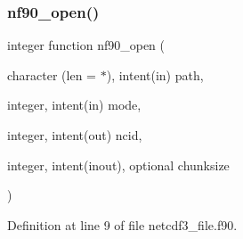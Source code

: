 \mbox{\label{netcdf3__file_8f90_ab845345239658f63b7e99d7700c1ad98}} 
\subsubsection{\texorpdfstring{nf90\+\_\+open()}{nf90\_open()}}
{\footnotesize\ttfamily integer function nf90\+\_\+open (\begin{DoxyParamCaption}\item[{character (len = $\ast$), intent(in)}]{path,  }\item[{integer, intent(in)}]{mode,  }\item[{integer, intent(out)}]{ncid,  }\item[{integer, intent(inout), optional}]{chunksize }\end{DoxyParamCaption})}



Definition at line 9 of file netcdf3\+\_\+file.\+f90.

